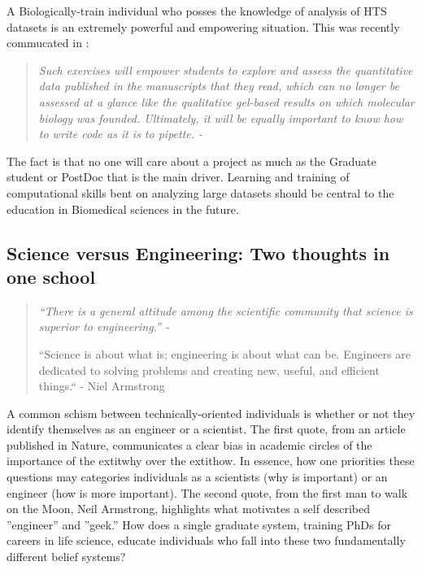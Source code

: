     A Biologically-train individual who posses the knowledge of analysis of HTS datasets is an extremely powerful and empowering situation. This was recently commucated in \citet{Plocik2013}:

    \begin{quote} %
      \itshape 
      Such exercises will empower students to explore and assess the quantitative data published in the manuscripts that they read, which can no longer be assessed at a glance like the qualitative gel-based results on which molecular biology was founded. Ultimately, it will be equally important to know how to write code as it is to pipette. - \citep{Plocik2013}
      \singlespacing
      \end{quote}

    The fact is that no one will care about a project as much as the Graduate student or PostDoc that is the main driver. Learning and training of computational skills bent on analyzing large datasets should be central to the education in Biomedical sciences in the future.

  \subsection{Science versus Engineering: Two thoughts in one school}

    \begin{quote}
      \itshape 
      \singlespacing
        “There is a general attitude among the scientific community that science is superior to engineering.” - \citep{Macilwain2010}

      “Science is about what is; engineering is about what can be. Engineers are dedicated to solving problems and creating new, useful, and efficient things.“ - Niel Armstrong
      \end{quote}

    A common schism between technically-oriented individuals is whether or not they identify themselves as an engineer or a scientist. The first quote, from an article published in Nature, communicates a clear bias in academic circles of the importance of the   extit{why} over the   extit{how}. In essence, how one priorities these questions may categories individuals as a scientists (why is important) or an engineer (how is more important). The second quote, from the first man to walk on the Moon, Neil Armstrong, highlights what motivates a self described ”engineer” and ”geek.” How does a single graduate system, training PhDs for careers in life science, educate individuals who fall into these two fundamentally different belief systems?

